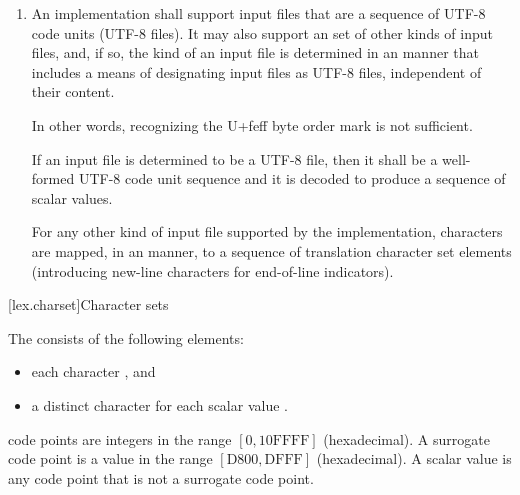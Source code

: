 \documentclass{wg21}
\newcommand{\replaceucs}{\changed{UCS}{Unicode}}
\begin{document}
\begin{enumerate}
    \item
    An implementation shall support input files
    that are a sequence of UTF-8 code units (UTF-8 files).
    It may also support
    an  set of other kinds of input files, and,
    if so, the kind of an input file is determined in
    an  manner
    that includes a means of designating input files as UTF-8 files,
    independent of their content.
    \begin{note}
        In other words,
        recognizing the U+feff byte order mark is not sufficient.
    \end{note}
    If an input file is determined to be a UTF-8 file,
    then it shall be a well-formed UTF-8 code unit sequence and
    it is decoded to produce a sequence of \replaceucs{} scalar values.

    For any other kind of input file supported by the implementation,
    characters are mapped, in an
     manner,
    to a sequence of translation character set elements
    (introducing new-line characters for end-of-line indicators).
\end{enumerate}

[lex.charset]{Character sets}

\pnum
{}%
The  consists of the following elements:
\begin{itemize}
    \item
    each  character , and
    \item
    a distinct character for each \replaceucs{} scalar value
    .
\end{itemize}
\begin{note}
     code points are integers
    in the range $[0, \mathrm{10FFFF}]$ (hexadecimal).
    A surrogate code point is a value
    in the range $[\mathrm{D800}, \mathrm{DFFF}]$ (hexadecimal).
    A \replaceucs{} scalar value is any code point that is not a surrogate code point.
\end{note}
\end{document}
